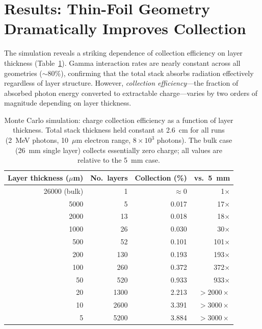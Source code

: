 \documentclass[12pt]{article}
\begin{document}
\section{Results: Thin-Foil Geometry Dramatically Improves Collection}
\label{sec:results}

The simulation reveals a striking dependence of collection efficiency on layer thickness
(Table~\ref{tab:thickness}). Gamma interaction rates are nearly constant across all
geometries ($\sim$80\%), confirming that the total stack absorbs radiation effectively
regardless of layer structure. However, \emph{collection efficiency}---the fraction of
absorbed photon energy converted to extractable charge---varies by two orders of
magnitude depending on layer thickness.

\begin{table}[h]
\centering
\caption{Monte Carlo simulation: charge collection efficiency as a function of layer
thickness. Total stack thickness held constant at 2.6~cm for all runs (2~MeV photons,
10~$\mu$m electron range, $8\times10^3$ photons). The bulk case (26~mm single layer)
collects essentially zero charge; all values are relative to the 5~mm case.}
\label{tab:thickness}
\begin{tabular}{rrrr}
\toprule
Layer thickness ($\mu$m) & No.\ layers & Collection (\%) & vs.\ 5~mm \\
\midrule
26000 (bulk) & 1    & $\approx 0$  & 1$\times$ \\
5000         & 5    & 0.017        & 17$\times$ \\
2000         & 13   & 0.018        & 18$\times$ \\
1000         & 26   & 0.030        & 30$\times$ \\
500          & 52   & 0.101        & 101$\times$ \\
200          & 130  & 0.193        & 193$\times$ \\
100          & 260  & 0.372        & 372$\times$ \\
50           & 520  & 0.933        & 933$\times$ \\
20           & 1300 & 2.213        & $>2000\times$ \\
10           & 2600 & 3.391        & $>3000\times$ \\
5            & 5200 & 3.884        & $>3000\times$ \\
\bottomrule
\end{tabular}
\end{table}
\end{document}
